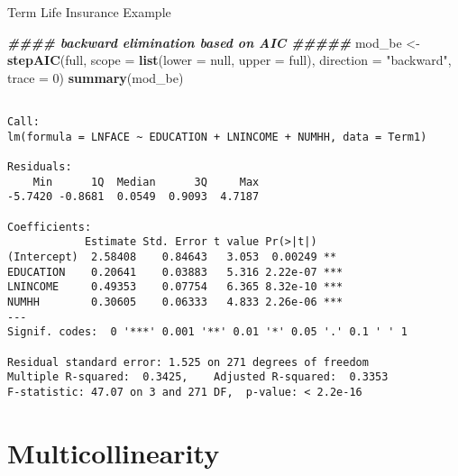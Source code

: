 \documentclass[
  ignorenonframetext,
]{beamer}
\newenvironment{Shaded}{\begin{snugshade}}{\end{snugshade}}
\newcommand{\AttributeTok}[1]{\textcolor[rgb]{0.13,0.29,0.53}{#1}}
\newcommand{\DecValTok}[1]{\textcolor[rgb]{0.00,0.00,0.81}{#1}}
\newcommand{\DocumentationTok}[1]{\textcolor[rgb]{0.56,0.35,0.01}{\textbf{\textit{#1}}}}
\newcommand{\FunctionTok}[1]{\textcolor[rgb]{0.13,0.29,0.53}{\textbf{#1}}}
\newcommand{\NormalTok}[1]{#1}
\newcommand{\OtherTok}[1]{\textcolor[rgb]{0.56,0.35,0.01}{#1}}
\newcommand{\StringTok}[1]{\textcolor[rgb]{0.31,0.60,0.02}{#1}}
\begin{document}
\begin{frame}[fragile]{Term Life Insurance Example}
\protect\hypertarget{term-life-insurance-example-6}{}
\scriptsize

\begin{Shaded}
\begin{Highlighting}[]
\DocumentationTok{\#\#\#\# backward elimination based on AIC \#\#\#\#\#}
\NormalTok{mod\_be }\OtherTok{\textless{}{-}} \FunctionTok{stepAIC}\NormalTok{(full, }\AttributeTok{scope =} \FunctionTok{list}\NormalTok{(}\AttributeTok{lower =}\NormalTok{ null, }\AttributeTok{upper =}\NormalTok{ full), }
                 \AttributeTok{direction =} \StringTok{"backward"}\NormalTok{, }\AttributeTok{trace =} \DecValTok{0}\NormalTok{)}
\FunctionTok{summary}\NormalTok{(mod\_be)}
\end{Highlighting}
\end{Shaded}

\begin{verbatim}

Call:
lm(formula = LNFACE ~ EDUCATION + LNINCOME + NUMHH, data = Term1)

Residuals:
    Min      1Q  Median      3Q     Max 
-5.7420 -0.8681  0.0549  0.9093  4.7187 

Coefficients:
            Estimate Std. Error t value Pr(>|t|)    
(Intercept)  2.58408    0.84643   3.053  0.00249 ** 
EDUCATION    0.20641    0.03883   5.316 2.22e-07 ***
LNINCOME     0.49353    0.07754   6.365 8.32e-10 ***
NUMHH        0.30605    0.06333   4.833 2.26e-06 ***
---
Signif. codes:  0 '***' 0.001 '**' 0.01 '*' 0.05 '.' 0.1 ' ' 1

Residual standard error: 1.525 on 271 degrees of freedom
Multiple R-squared:  0.3425,    Adjusted R-squared:  0.3353 
F-statistic: 47.07 on 3 and 271 DF,  p-value: < 2.2e-16
\end{verbatim}

\normalsize
\end{frame}

\hypertarget{multicollinearity}{%
\section{Multicollinearity}\label{multicollinearity}}
\end{document}
